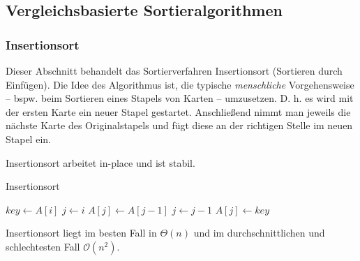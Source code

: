 \subsection{Vergleichsbasierte Sortieralgorithmen}

\subsubsection{Insertionsort}
Dieser Abschnitt behandelt das Sortierverfahren Insertionsort (Sortieren durch Einfügen). Die Idee des Algorithmus ist, die typische \emph{menschliche} Vorgehensweise -- bspw. beim Sortieren eines Stapels von Karten -- umzusetzen. D. h. es wird mit der ersten Karte ein neuer Stapel gestartet. Anschließend nimmt man jeweils die nächste Karte des Originalstapels und fügt diese an der richtigen Stelle im neuen Stapel ein.

\begin{anm}
	Insertionsort arbeitet in-place und ist stabil.
\end{anm}

\begin{algorithm}
	\caption{Insertionsort}
	\begin{algorithmic}[0]
		\State $key \gets A[i]$
		\State $j \gets i$
		\State $A[j] \gets A[j-1]$
		\State $j \gets j - 1$
		\EndWhile
		\State $A[j] \gets key$
		\EndFor
	\end{algorithmic}
\end{algorithm}

\begin{proposition}[Laufzeit]
	Insertionsort liegt im besten Fall in $\Theta(n)$ und im durchschnittlichen und schlechtesten Fall $\mathcal{O}(n^2)$.
\end{proposition}

